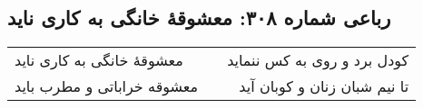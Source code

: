 \begin{center}
\section*{رباعی شماره ۳۰۸: معشوقهٔ خانگی به کاری ناید}
\label{sec:sh308}
\begin{longtable}{l p{0.5cm} r}
معشوقهٔ خانگی به کاری ناید
&&
کودل برد و روی به کس ننماید
\\
معشوقه خراباتی و مطرب باید
&&
تا نیم شبان زنان و کوبان آید
\\
\end{longtable}
\end{center}
